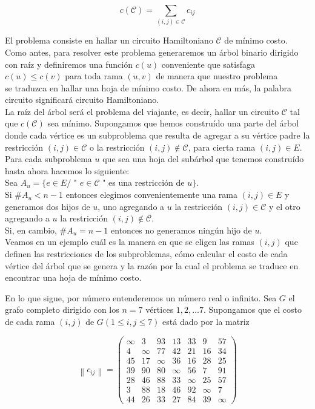 \documentclass[10pt]{article}
\begin{document}
$$
c(\mathcal{C})=\sum_{(i, j) \in \mathcal{C}} c_{i j}
$$

El problema consiste en hallar un circuito Hamiltoniano $\mathcal{C}$ de mínimo costo.\\
Como antes, para resolver este problema generaremos un árbol binario dirigido con raíz y definiremos una función $c(u)$ conveniente que satisfaga $c(u) \leq c(v)$ para toda rama $(u, v)$ de manera que nuestro problema\\
se traduzca en hallar una hoja de mínimo costo. De ahora en más, la palabra circuito significará circuito Hamiltoniano.\\
La raíz del árbol será el problema del viajante, es decir, hallar un circuito $\mathcal{C}$ tal que $c(\mathcal{C})$ sea mínimo. Supongamos que hemos construído una parte del árbol donde cada vértice es un subproblema que resulta de agregar a su vértice padre la restricción $(i, j) \in \mathcal{C}$ o la restricción $(i, j) \notin \mathcal{C}$, para cierta rama $(i, j) \in E$.\\
Para cada subproblema $u$ que sea una hoja del subárbol que tenemos construído hasta ahora hacemos lo siguiente:\\
Sea $A_{u}=\{e \in E /$ " $e \in \mathcal{C}$ " es una restricción de $u\}$.\\
Si $\# A_{u}<n-1$ entonces elegimos convenientemente una rama $(i, j) \in E$ y generamos dos hijos de $u$, uno agregando a $u$ la restricción $(i, j) \in \mathcal{C}$ y el otro agregando a $u$ la restricción $(i, j) \notin \mathcal{C}$.\\
Si, en cambio, $\# A_{u}=n-1$ entonces no generamos ningún hijo de $u$.\\
Veamos en un ejemplo cuál es la manera en que se eligen las ramas $(i, j)$ que definen las restricciones de los subproblemas, cómo calcular el costo de cada vértice del árbol que se genera y la razón por la cual el problema se traduce en encontrar una hoja de mínimo costo.

En lo que sigue, por número entenderemos un número real o infinito. Sea $G$ el grafo completo dirigido con los $n=7$ vértices $1,2, \ldots 7$. Supongamos que el costo de cada rama $(i, j)$ de $G(1 \leq i, j \leq 7)$ está dado por la matriz

$$
\left\|c_{i j}\right\|=\left(\begin{array}{ccccccc}
\infty & 3 & 93 & 13 & 33 & 9 & 57 \\
4 & \infty & 77 & 42 & 21 & 16 & 34 \\
45 & 17 & \infty & 36 & 16 & 28 & 25 \\
39 & 90 & 80 & \infty & 56 & 7 & 91 \\
28 & 46 & 88 & 33 & \infty & 25 & 57 \\
3 & 88 & 18 & 46 & 92 & \infty & 7 \\
44 & 26 & 33 & 27 & 84 & 39 & \infty
\end{array}\right)
$$
\end{document}
